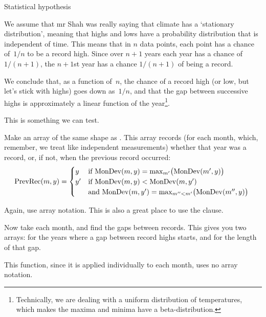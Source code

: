 \begin{comment}
\begin{verbatim}
DATAFILE = GLB.Ts.txt
run_annual : annual
	@(    cat ${DATAFILE} | grep '^[12]' | grep -v 2018 | wc -l \
	   && cat ${DATAFILE} | grep '^[12]' | grep -v 2018 \
	 ) | ./annual
\end{verbatim}
\end{comment}

 {Statistical hypothesis}

We assume that mr Shah was really saying that climate has a
`stationary distribution', meaning that highs and lows have a
probability distribution that is independent of time.
This means that in $n$ data points, each point has a chance
of~$1/n$ to be a record high. Since over $n+1$ years each year has a
chance of $1/(n+1)$, the $n+1$st year has a chance $1/(n+1)$ of being a
record.

We conclude that, as a function
of~$n$, the chance of a record high (or low, but let's stick with
highs) goes down as~$1/n$, and that the gap between successive highs
is approximately a linear function of the year\footnote {Technically,
  we are dealing with a uniform distribution of temperatures, which
  makes the maxima and minima have a beta-distribution.}.

This is something we can test.

\begin{exercise}
  Make an array  of the same shape as
  . This array records (for each month, which,
  remember, we treat like independent measurements) whether
  that year was a record, or, if not, when the previous record
  occurred:
  \[ \mathrm{PrevRec}(m,y) = 
  \begin{cases}
    y&\hbox{if
      $\mathrm{MonDev}(m,y) = \max_{m'} \bigl( \mathrm{MonDev}(m',y)\bigr)$
    }\\
    y'&\hbox{if
      $\mathrm{MonDev}(m,y) < \mathrm{MonDev}(m,y')$ }\\
      &\hbox{and
      $\mathrm{MonDev}(m,y') = \max_{m''<m'}\bigl( \mathrm{MonDev}(m'',y)\bigr)$
    }\\
  \end{cases}
  \]

  Again, use array notation. This is also a great place to use the
   clause.
\end{exercise}

\begin{exercise}
  Now take each month, and find the gaps between records. This gives
  you two arrays:  for the years where a gap between
  record highs starts, and \n{gapsizes} for the length of that gap.

  This function, since it is applied individually to each month, uses
  no array notation.
\end{exercise}

